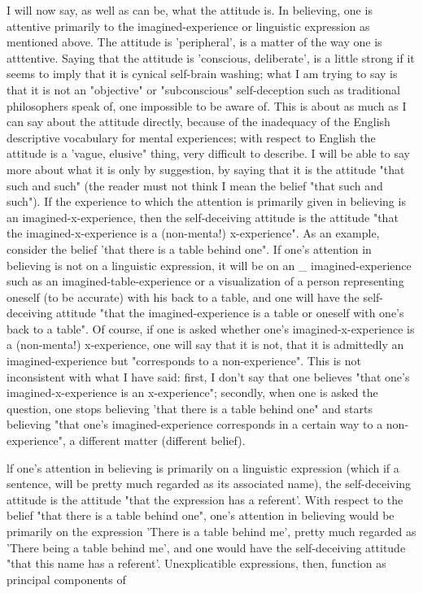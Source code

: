 \documentclass[10pt,twoside]{memoir}
\begin{document}
\begin{enumerate}
{{{{{{{{{{{{{{{I will now say, as well as can be, what the attitude is. In believing, one 
is attentive primarily to the imagined-experience or linguistic expression as 
mentioned above. The attitude is 'peripheral', is a matter of the way one is 
atttentive. Saying that the attitude is 'conscious, deliberate', is a little 
strong if it seems to imply that it is cynical self-brain washing; what I am 
trying to say is that it is not an "objective" or "subconscious" self-deception 
such as traditional philosophers speak of, one impossible to be aware of. This 
is about as much as I can say about the attitude directly, because of the 
inadequacy of the English descriptive vocabulary for mental experiences; 
with respect to English the attitude is a 'vague, elusive" thing, very difficult 
to describe. I will be able to say more about what it is only by suggestion, by 
saying that it is the attitude "that such and such" (the reader must not think 
I mean the belief "that such and such"). If the experience to which the 
attention is primarily given in believing is an imagined-x-experience, then the 
self-deceiving attitude is the attitude "that the imagined-x-experience is a 
(non-menta!) x-experience". As an example, consider the belief 'that there is 
a table behind one". If one's attention in believing is not on a linguistic 
expression, it will be on an _ imagined-experience such as an 
imagined-table-experience or a visualization of a person representing oneself 
(to be accurate) with his back to a table, and one will have the self-deceiving 
attitude "that the imagined-experience is a table or oneself with one's back 
to a table". Of course, if one is asked whether one's imagined-x-experience is 
a (non-menta!) x-experience, one will say that it is not, that it is admittedly 
an imagined-experience but "corresponds to a non-experience". This is not 
inconsistent with what I have said: first, I don't say that one believes "that 
one's imagined-x-experience is an x-experience"; secondly, when one is asked 
the question, one stops believing 'that there is a table behind one" and starts 
believing "that one's imagined-experience corresponds in a certain way to a 
non-experience", a different matter (different belief). 

lf one's attention in believing is primarily on a linguistic expression 
(which if a sentence, will be pretty much regarded as its associated name), 
the self-deceiving attitude is the attitude "that the expression has a 
referent'. With respect to the belief "that there is a table behind one", one's 
attention in believing would be primarily on the expression 'There is a table 
behind me', pretty much regarded as 'There being a table behind me', and 
one would have the self-deceiving attitude "that this name has a referent'. 
Unexplicatible expressions, then, function as principal components of 


}}}}}}}}}}}}}}}
\end{enumerate}
\end{document}
